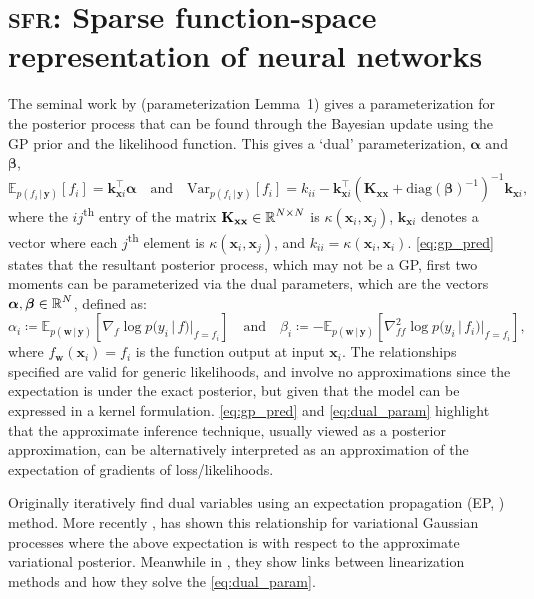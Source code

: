 \documentclass{article}
\renewcommand{\paragraph}[1]{{\bf #1}~~}
\newcommand{\our}{\textsc{sfr}\xspace}
\newcommand{\mathbold}[1]{\bm{#1}}
\newcommand{\mbf}[1]{\mathbf{#1}}
\renewcommand{\mid}{\,|\,}
\newcommand{\valpha}[0]{\mathbold{\alpha}}
\newcommand{\vbeta}[0]{\mathbold{\beta}}
\newcommand{\diag}{\text{{diag}}}
\newcommand{\vx}{\mbf{x}}
\newcommand{\vy}{\mbf{y}}
\newcommand{\vw}{\mbf{w}}
\newcommand{\MKxx}{\mbf{K}_{\mbf{x}\mbf{x}}}
\newcommand{\vk}{\mbf{k}}
\newcommand{\myexpect}{\mathbb{E}}
\begin{document}
\section{\our: Sparse function-space representation of neural networks}
The seminal work by \citet{csato2002sparse} (parameterization Lemma~1) gives a parameterization for the posterior process that can be found through the Bayesian update using the GP prior and the likelihood function. This gives a `dual' parameterization, $\valpha$ and $\vbeta$,
%
\begin{equation}  \label{eq:gp_pred}
  \myexpect_{p(f_i \mid\vy)}[f_i]= \vk_{\vx i}^\top \valpha \quad \text{and} \quad
  \mathrm{Var}_{p(f_i \mid \vy)}[f_i] = k_{ii} - \vk_{\vx i}^\top ( \MKxx + \diag(\vbeta)^{-1})^{-1} \vk_{\vx i},
\end{equation}
%
where the $ij$\textsuperscript{th} entry of the matrix $\MKxx \in \R^{N \times N}$ is $\kappa(\vx_i,\vx_j)$, $\vk_{\vx i}$ denotes a vector where each $j$\textsuperscript{th} element is $\kappa(\vx_i, \vx_j)$, and $k_{ii} = \kappa(\vx_i, \vx_i)$. \cref{eq:gp_pred} states that the resultant posterior process, which may not be a GP, first two moments can be parameterized via the dual parameters, which are the vectors $\valpha, \vbeta \in \R^{N}$, defined as:
%
\begin{equation}
  \label{eq:dual_param}
  \alpha_i \coloneqq \myexpect_{p(\vw \mid \vy)}[\nabla_{f}\log p(y_i \mid f) |_{f=f_i}]
  \quad \text{and} \quad
  \beta_i \coloneqq - \myexpect_{p(\vw \mid \vy)}[\nabla^2_{f f}\log p(y_i \mid f_i) |_{f=f_i}],
\end{equation}
%
where $f_\vw(\vx_i) = f_i$ is the function output at input $\vx_i$. The relationships specified are valid for generic likelihoods, and involve no approximations since the expectation is under the exact posterior, but given that the model can be expressed in a kernel formulation. \cref{eq:gp_pred} and \cref{eq:dual_param} highlight that the approximate inference technique, usually viewed as a posterior approximation, can be alternatively interpreted as an approximation of the expectation of gradients of loss/likelihoods.

Originally \citet{csato2002sparse} iteratively find dual variables using an expectation propagation (EP, \cite{minka2001expectation}) method. More recently \cite{khan2017conjugate,adam2021dual}, has shown this relationship for variational Gaussian processes where the above expectation is with respect to the approximate variational posterior. Meanwhile in \citet{wilkinson2023bayes}, they show links between linearization methods and how they solve the  \cref{eq:dual_param}.
\end{document}
